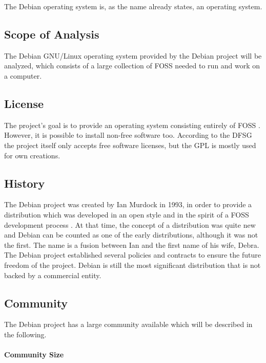 The Debian operating system is, as the name already states, an operating
system.

\subsection{Scope of Analysis}

The Debian \acs{GNU}/Linux operating system provided by the Debian project will
be analyzed, which consists of a large collection of \ac{FOSS} needed to run
and work on a computer.

\subsection{License}

The project's goal is to provide an operating system consisting entirely of
\ac{FOSS} \cite{DebianLicense,DebianFAQ}. However, it is possible to install
non-free software too. According to the \ac{DFSG} the project itself only
accepts free software licenses, but the \ac{GPL} is mostly used for own
creations.

\subsection{History}

The Debian project was created by Ian Murdock in 1993, in order to provide a
distribution which was developed in an open style and in the spirit of a
\ac{FOSS} development process \cite{DebianAbout,DebianHistory,Sadowski2008}. At
that time, the concept of a distribution was quite new and Debian can be
counted as one of the early distributions, although it was not the first. The
name is a fusion between Ian and the first name of his wife, Debra. The Debian
project established several policies and contracts to ensure the future freedom
of the project. Debian is still the most significant distribution that is not
backed by a commercial entity.

\subsection{Community}

The Debian project has a large community available which will be described in
the following.

\paragraph{Community Size}

